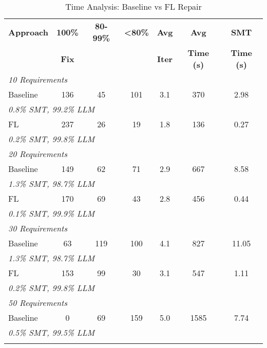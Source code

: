 \begin{table}[t]
\centering
\caption{Time Analysis: Baseline vs FL Repair}
\label{tab:time_compact}
\footnotesize
\setlength{\tabcolsep}{3pt}
\begin{tabular}{lcccccc}
\toprule
\textbf{Approach} & \textbf{100\%} & \textbf{80-99\%} & \textbf{<80\%} & \textbf{Avg} & \textbf{Avg} & \textbf{SMT} \\
& \textbf{Fix} & & & \textbf{Iter} & \textbf{Time (s)} & \textbf{Time (s)} \\
\midrule
\multicolumn{7}{l}{\textit{10 Requirements}} \\
Baseline & 136 & 45 & 101 & 3.1 & 370 & 2.98 \\
\multicolumn{7}{l}{\hspace{1em}\textit{\footnotesize 0.8\% SMT, 99.2\% LLM}} \\
\addlinespace
FL & 237 & 26 & 19 & 1.8 & 136 & 0.27 \\
\multicolumn{7}{l}{\hspace{1em}\textit{\footnotesize 0.2\% SMT, 99.8\% LLM}} \\
\midrule
\multicolumn{7}{l}{\textit{20 Requirements}} \\
Baseline & 149 & 62 & 71 & 2.9 & 667 & 8.58 \\
\multicolumn{7}{l}{\hspace{1em}\textit{\footnotesize 1.3\% SMT, 98.7\% LLM}} \\
\addlinespace
FL & 170 & 69 & 43 & 2.8 & 456 & 0.44 \\
\multicolumn{7}{l}{\hspace{1em}\textit{\footnotesize 0.1\% SMT, 99.9\% LLM}} \\
\midrule
\multicolumn{7}{l}{\textit{30 Requirements}} \\
Baseline & 63 & 119 & 100 & 4.1 & 827 & 11.05 \\
\multicolumn{7}{l}{\hspace{1em}\textit{\footnotesize 1.3\% SMT, 98.7\% LLM}} \\
\addlinespace
FL & 153 & 99 & 30 & 3.1 & 547 & 1.11 \\
\multicolumn{7}{l}{\hspace{1em}\textit{\footnotesize 0.2\% SMT, 99.8\% LLM}} \\
\midrule
\multicolumn{7}{l}{\textit{50 Requirements}} \\
Baseline & 0 & 69 & 159 & 5.0 & 1585 & 7.74 \\
\multicolumn{7}{l}{\hspace{1em}\textit{\footnotesize 0.5\% SMT, 99.5\% LLM}} \\
\addlinespace
\bottomrule
\end{tabular}
\end{table}
